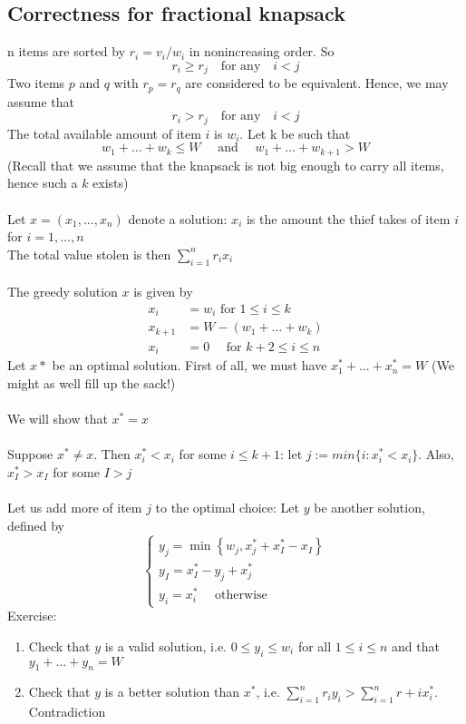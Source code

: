 \documentclass{article}[18pt]
\begin{document}
\subsection{Correctness for fractional knapsack}
n items are sorted by $r_i=v_i/w_i$ in nonincreasing order. So
$$r_i \geqslant r_j \quad \text{for any} \quad i<j$$
Two items $p$ and $q$ with $r_p=r_q$ are considered to be equivalent. Hence, we may assume that
$$r_i > r_j \quad \text{for any} \quad i<j$$
The total available amount of item $i$ is $w_i$. Let k be such that
\[
w_{1}+\ldots+w_{k} \leq W \quad \text { and } \quad w_{1}+\ldots+w_{k+1}>W
\]
(Recall that we assume that the knapsack is not big enough to carry all items, hence such a $k$ exists)\\
\\
Let $x=(x_1,...,x_n)$ denote a solution: $x_i$ is the amount the thief takes of item $i$ for $i=1,...,n$\\
The total value stolen is then $\sum_{i=1}^{n}r_ix_i$\\
\\
The greedy solution $x$ is given by
\[
\begin{aligned} x_{i} &=w_{i} \text { for } 1 \leq i \leq k \\ x_{k+1} &=W-\left(w_{1}+\ldots+w_{k}\right) \\ x_{i} &=0 \quad \text { for } k+2 \leq i \leq n \end{aligned}
\]
Let $x*$ be an optimal solution. First of all, we must have $x^*_1+...+x^*_n=W$ (We might as well fill up the sack!)\\
\\
We will show that $x^*=x$\\
\\
Suppose $x^*\neq x$. Then $x^*_i<x_i$ for some $i\leqslant k+1$: let $j := min\{i: x^*_i<x_i\}$. Also, $x^*_I>x_I$ for some $I>j$\\
\\
Let us add more of item $j$ to the optimal choice: Let $y$ be another solution, defined by
\[
\left\{\begin{array}{l}{y_{j}=\min \left\{w_{j}, x_{j}^{*}+x_{I}^{*}-x_{I}\right\}} \\ {y_{I}=x_{I}^{*}-y_{j}+x_{j}^{*}} \\ {y_{i}=x_{i}^{*} \quad \text { otherwise }}\end{array}\right.
\]
Exercise:
\begin{enumerate}
	\item Check that $y$ is a valid solution, i.e. $0\leqslant y_i \leqslant w_i$ for all $1\leqslant i \leqslant n$ and that $y_1+...+ y_n=W$
	\item Check that $y$ is a better solution than $x^*$, i.e. $\sum_{i=1}^{n}r_iy_i>\sum_{i=1}^{n}r+ix^*_i$. Contradiction
\end{enumerate}
\end{document}
